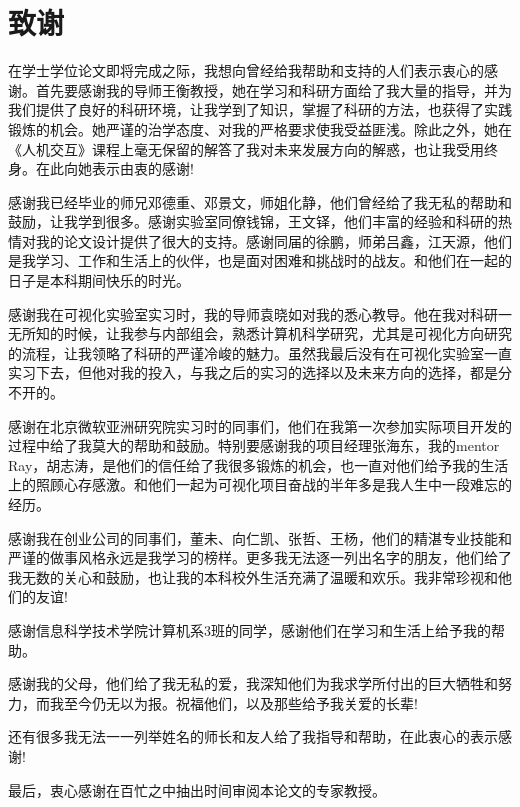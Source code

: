 \chapter{致谢}

在学士学位论文即将完成之际，我想向曾经给我帮助和支持的人们表示衷心的感谢。首先要感谢我的导师王衡教授，她在学习和科研方面给了我大量的指导，并为我们提供了良好的科研环境，让我学到了知识，掌握了科研的方法，也获得了实践锻炼的机会。她严谨的治学态度、对我的严格要求使我受益匪浅。除此之外，她在《人机交互》课程上毫无保留的解答了我对未来发展方向的解惑，也让我受用终身。在此向她表示由衷的感谢!

感谢我已经毕业的师兄邓德重、邓景文，师姐化静，他们曾经给了我无私的帮助和鼓励，让我学到很多。感谢实验室同僚钱锦，王文铎，他们丰富的经验和科研的热情对我的论文设计提供了很大的支持。感谢同届的徐鹏，师弟吕鑫，江天源，他们是我学习、工作和生活上的伙伴，也是面对困难和挑战时的战友。和他们在一起的日子是本科期间快乐的时光。

感谢我在可视化实验室实习时，我的导师袁晓如对我的悉心教导。他在我对科研一无所知的时候，让我参与内部组会，熟悉计算机科学研究，尤其是可视化方向研究的流程，让我领略了科研的严谨冷峻的魅力。虽然我最后没有在可视化实验室一直实习下去，但他对我的投入，与我之后的实习的选择以及未来方向的选择，都是分不开的。

感谢在北京微软亚洲研究院实习时的同事们，他们在我第一次参加实际项目开发的过程中给了我莫大的帮助和鼓励。特别要感谢我的项目经理张海东，我的mentor Ray，胡志涛，是他们的信任给了我很多锻炼的机会，也一直对他们给予我的生活上的照顾心存感激。和他们一起为可视化项目奋战的半年多是我人生中一段难忘的经历。

感谢我在创业公司的同事们，董未、向仁凯、张哲、王杨，他们的精湛专业技能和严谨的做事风格永远是我学习的榜样。更多我无法逐一列出名字的朋友，他们给了我无数的关心和鼓励，也让我的本科校外生活充满了温暖和欢乐。我非常珍视和他们的友谊!

感谢信息科学技术学院计算机系3班的同学，感谢他们在学习和生活上给予我的帮助。

感谢我的父母，他们给了我无私的爱，我深知他们为我求学所付出的巨大牺牲和努力，而我至今仍无以为报。祝福他们，以及那些给予我关爱的长辈!

还有很多我无法一一列举姓名的师长和友人给了我指导和帮助，在此衷心的表示感谢!

最后，衷心感谢在百忙之中抽出时间审阅本论文的专家教授。
